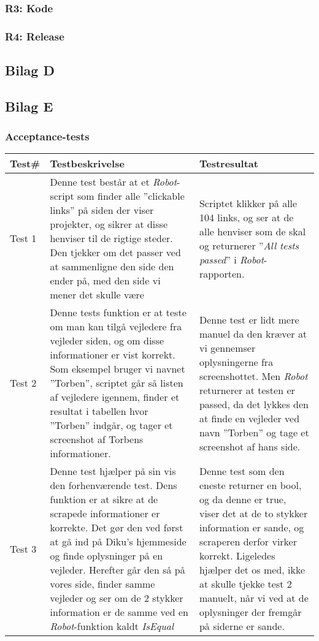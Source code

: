 \documentclass[12pt]{article}
\begin{document}
\subsubsection{R3: Kode}
\subsubsection{R4: Release}
\subsection{Bilag D}

\newpage
\subsection{Bilag E}
\subsubsection*{Acceptance-tests}
\begin{center}
	\begin{tabular}{|p{}|p{}|p{}|}
		\hline
	\textbf{Test\#} & \textbf{Testbeskrivelse} & \textbf{Testresultat} \\ \hline

	Test 1 & Denne test består at et \textit{Robot}-script som finder alle ''clickable links'' på siden der viser projekter, og sikrer at disse henviser til de rigtige steder. Den tjekker om det passer ved at sammenligne den side den ender på, med den side vi mener det skulle være & Scriptet klikker på alle 104 links, og ser at de alle henviser som de skal og returnerer ''\textit{All tests passed}'' i \textit{Robot}-rapporten.  \\ \hline

	Test 2 & Denne tests funktion er at teste om man kan tilgå vejledere fra vejleder siden, og om disse informationer er vist korrekt. Som eksempel bruger vi navnet ''Torben'', scriptet går så listen af vejledere igennem, finder et resultat i tabellen hvor ''Torben'' indgår, og tager et screenshot af Torbens informationer. & Denne test er lidt mere manuel da den kræver at vi gennemser oplysningerne fra screenshottet. Men \textit{Robot} returnerer at testen er passed, da det lykkes den at finde en vejleder ved navn ''Torben'' og tage et screenshot af hans side.\\ \hline

	Test 3 & Denne test hjælper på sin vis den forhenværende test. Dens funktion er at sikre at de scrapede informationer er korrekte. Det gør den ved først at gå ind på Diku's hjemmeside og finde oplysninger på en vejleder. Herefter går den så på vores side, finder samme vejleder og ser om de 2 stykker information er de samme ved en \textit{Robot}-funktion kaldt \textit{IsEqual} & Denne test som den eneste returner en bool, og da denne er true, viser det at de to stykker information er sande, og scraperen derfor virker korrekt. \newline
	Ligeledes hjælper det os med, ikke at skulle tjekke test 2 manuelt, når vi ved at de oplysninger der fremgår på siderne er sande. \\ \hline
	\end{tabular}
\end{center}
\newpage
\end{document}
